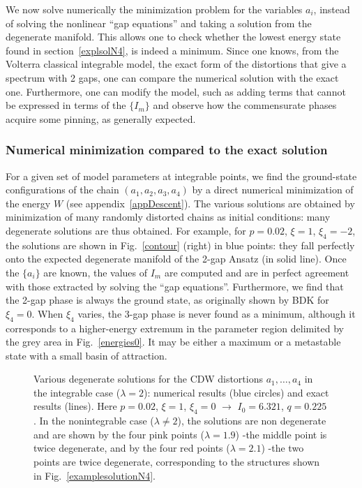 \documentclass[]{revtex4-1}
\begin{document}
We now solve numerically the minimization problem  for the variables $a_i$, instead of solving the nonlinear ``gap equations'' and taking a solution from the degenerate manifold. This allows one to check whether the lowest energy state found in section~\ref{explsolN4}, is indeed a minimum. Since one knows, from the Volterra classical integrable model, the exact form of the distortions that give a spectrum with 2 gaps, one can compare the numerical solution with the exact one.
Furthermore, one can modify the model, such as adding terms that cannot be expressed in terms of the $\{I_m \}$ and observe how the commensurate phases acquire some pinning, as generally expected.

\subsubsection{Numerical minimization compared to the exact solution}
\label{numN4}


For a given set of model parameters at integrable points,  we find the ground-state configurations of the chain $(a_1,a_2,a_3,a_4)$ by a direct numerical minimization of the energy $W$ (see appendix~\ref{appDescent}).
The various solutions are obtained by minimization of many randomly distorted chains as initial conditions: many degenerate solutions are thus obtained.
For example, for $p=0.02$, $\xi=1$, $\xi_4=-2$, the solutions are shown in Fig.~\ref{contour} (right) in blue points: they fall perfectly onto the expected degenerate manifold of the 2-gap Ansatz (in solid line).
Once the $\{a_i\}$ are known, the values of $I_m$ are computed and are in perfect agreement with those extracted by solving the ``gap equations''. 
Furthermore, 
 we find that the 2-gap phase is always the ground state, as originally shown by BDK for $\xi_4=0$. When $\xi_4$ varies, the 3-gap phase is never found as a minimum, although it corresponds to a higher-energy extremum in the parameter region delimited by the grey area in Fig.~\ref{energies0}. It may be either a maximum or a metastable state with a small basin of attraction.
\begin{figure}[h]
 \begin{center}  
  \end{center} \caption{Various degenerate solutions for the CDW distortions $a_1,\dots,a_4$ in the integrable case ($\lambda=2$): numerical results (blue circles) and exact results (lines). Here $p=0.02$, $\xi=1$, $\xi_4=0$ $\rightarrow$ $I_0=6.321$, $q=0.225$.
 In the nonintegrable case ($\lambda \neq 2$), the solutions are non degenerate and are shown by the four pink points ($\lambda=1.9$) -the middle point is twice degenerate, and by the four red points ($\lambda=2.1$) -the two points are twice degenerate, corresponding to the structures shown in Fig.~\ref{examplesolutionN4}.}
  \label{explN4}
\end{figure}
\end{document}

